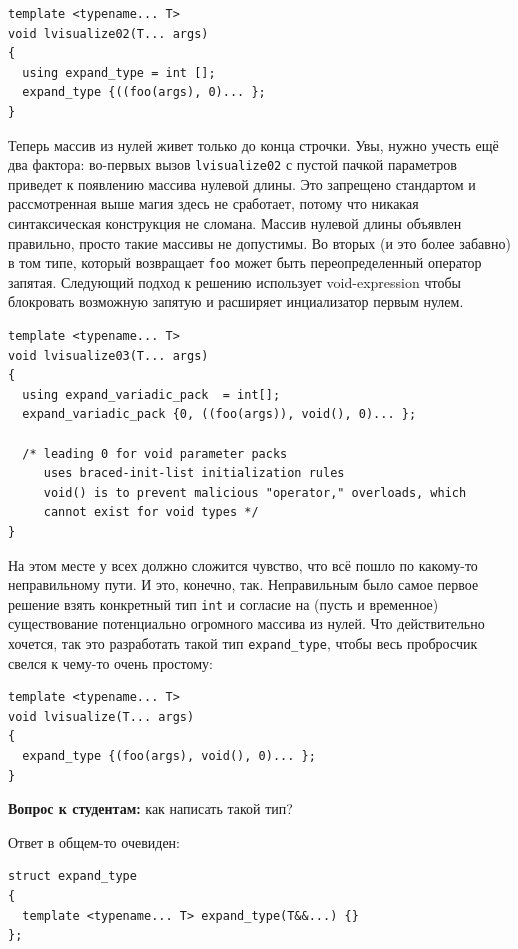 \documentclass[a4paper,12pt,oneside]{article}
\newif\ifanswers
\begin{document}
\begin{lstlisting}
template <typename... T>
void lvisualize02(T... args)
{
  using expand_type = int [];
  expand_type {((foo(args), 0)... };
}
\end{lstlisting}

Теперь массив из нулей живет только до конца строчки. Увы, нужно учесть ещё два фактора: во-первых вызов \lstinline!lvisualize02! с пустой пачкой параметров приведет к появлению массива нулевой длины. Это запрещено стандартом и рассмотренная выше магия здесь не сработает, потому что никакая синтаксическая конструкция не сломана. Массив нулевой длины объявлен правильно, просто такие массивы не допустимы. Во вторых (и это более забавно) в том типе, который возвращает \lstinline!foo! может быть переопределенный оператор запятая. Следующий подход к решению использует void-expression чтобы блокровать возможную запятую и расширяет инциализатор первым нулем.

\begin{lstlisting}
template <typename... T>
void lvisualize03(T... args)
{
  using expand_variadic_pack  = int[];
  expand_variadic_pack {0, ((foo(args)), void(), 0)... };

  /* leading 0 for void parameter packs
     uses braced-init-list initialization rules
     void() is to prevent malicious "operator," overloads, which
     cannot exist for void types */
}
\end{lstlisting}

На этом месте у всех должно сложится чувство, что всё пошло по какому-то неправильному пути. И это, конечно, так. Неправильным было самое первое решение взять конкретный тип \lstinline!int! и согласие на (пусть и временное) существование потенциально огромного массива из нулей. Что действительно хочется, так это разработать такой тип \lstinline!expand_type!, чтобы весь пробросчик свелся к чему-то очень простому:

\begin{lstlisting}
template <typename... T>
void lvisualize(T... args)
{
  expand_type {(foo(args), void(), 0)... };
}
\end{lstlisting}

\textbf{Вопрос к студентам:} как написать такой тип?

\ifanswers
Ответ в общем-то очевиден:

\begin{lstlisting}
struct expand_type
{
  template <typename... T> expand_type(T&&...) {}
};
\end{lstlisting}
\end{document}

